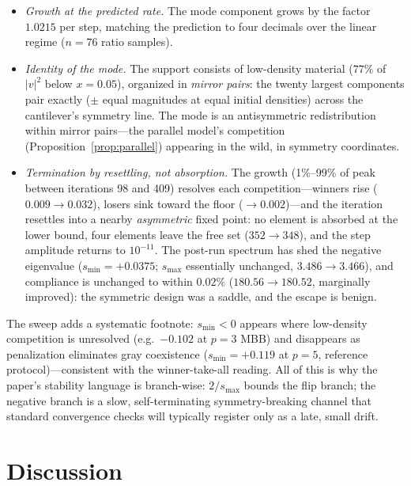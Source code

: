 \documentclass[11pt,a4paper]{article}
\newcommand{\smax}{s_{\max}}
\newcommand{\smin}{s_{\min}}
\begin{document}
\begin{itemize}
\item \emph{Growth at the predicted rate.} The mode component grows by the
  factor $1.0215$ per step, matching the prediction to four decimals over
  the linear regime ($n=76$ ratio samples).
\item \emph{Identity of the mode.} The support consists of low-density
  material ($77\%$ of $|v|^2$ below $x=0.05$), organized in
  \emph{mirror pairs}: the twenty largest components pair exactly
  ($\pm$ equal magnitudes at equal initial densities) across the
  cantilever's symmetry line. The mode is an antisymmetric redistribution
  within mirror pairs---the parallel model's competition
  (Proposition~\ref{prop:parallel}) appearing in the wild, in symmetry
  coordinates.
\item \emph{Termination by resettling, not absorption.} The growth
  (1\%--99\% of peak between iterations 98 and 409) resolves each
  competition---winners rise ($0.009\to0.032$), losers sink toward the
  floor ($\to0.002$)---and the iteration resettles into a nearby
  \emph{asymmetric} fixed point: no element is absorbed at the lower
  bound, four elements leave the free set ($352\to348$), and the step
  amplitude returns to $10^{-11}$. The post-run spectrum has shed the
  negative eigenvalue ($\smin=+0.0375$; $\smax$ essentially unchanged,
  $3.486\to3.466$), and compliance is unchanged to within $0.02\%$
  ($180.56\to180.52$, marginally improved): the symmetric design was a
  saddle, and the escape is benign.
\end{itemize}

The sweep adds a systematic footnote: $\smin<0$ appears where low-density
competition is unresolved (e.g.\ $-0.102$ at $p=3$ MBB) and disappears as
penalization eliminates gray coexistence ($\smin=+0.119$ at $p=5$,
reference protocol)---consistent with the winner-take-all reading. All of
this is why the paper's stability language is branch-wise: $2/\smax$
bounds the flip branch; the negative branch is a slow, self-terminating
symmetry-breaking channel that standard convergence checks will typically
register only as a late, small drift.

\section{Discussion}\label{sec:discussion}
\end{document}
